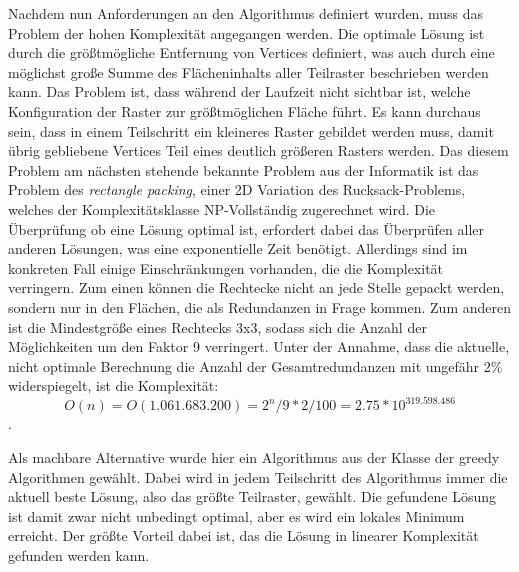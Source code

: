 Nachdem nun Anforderungen an den Algorithmus definiert wurden, muss das Problem der hohen Komplexität angegangen werden. Die optimale Lösung ist durch die größtmögliche Entfernung von Vertices definiert, was auch durch eine möglichst große Summe des Flächeninhalts aller Teilraster beschrieben werden kann. Das Problem ist, dass während der Laufzeit nicht sichtbar ist, welche Konfiguration der Raster zur größtmöglichen Fläche führt. Es kann durchaus sein, dass in einem Teilschritt ein kleineres Raster gebildet werden muss, damit übrig gebliebene Vertices Teil eines deutlich größeren Rasters werden. Das diesem Problem am nächsten stehende bekannte Problem aus der Informatik ist das Problem des \textit{rectangle packing}, einer 2D Variation des Rucksack-Problems, welches der Komplexitätsklasse NP-Vollständig zugerechnet wird. Die Überprüfung ob eine Lösung optimal ist, erfordert dabei das Überprüfen aller anderen Lösungen, was eine exponentielle Zeit benötigt. Allerdings sind im konkreten Fall einige Einschränkungen vorhanden, die die Komplexität verringern. Zum einen können die Rechtecke nicht an jede Stelle gepackt werden, sondern nur in den Flächen, die als Redundanzen in Frage kommen. Zum anderen ist die Mindestgröße eines Rechtecks 3x3, sodass sich die Anzahl der Möglichkeiten um den Faktor 9 verringert. Unter der Annahme, dass die aktuelle, nicht optimale Berechnung die Anzahl der Gesamtredundanzen mit ungefähr 2\% widerspiegelt, ist die Komplexität: \[O(n) = O(1.061.683.200) = 2^n / 9 * 2 / 100 = 2.75 * 10^{319.598.486}\].

Als machbare Alternative wurde hier ein Algorithmus aus der Klasse der greedy Algorithmen gewählt. Dabei wird in jedem Teilschritt des Algorithmus immer die aktuell beste Lösung, also das größte Teilraster, gewählt. Die gefundene Lösung ist damit zwar nicht unbedingt optimal, aber es wird ein lokales Minimum erreicht. Der größte Vorteil dabei ist, das die Lösung in linearer Komplexität gefunden werden kann.













